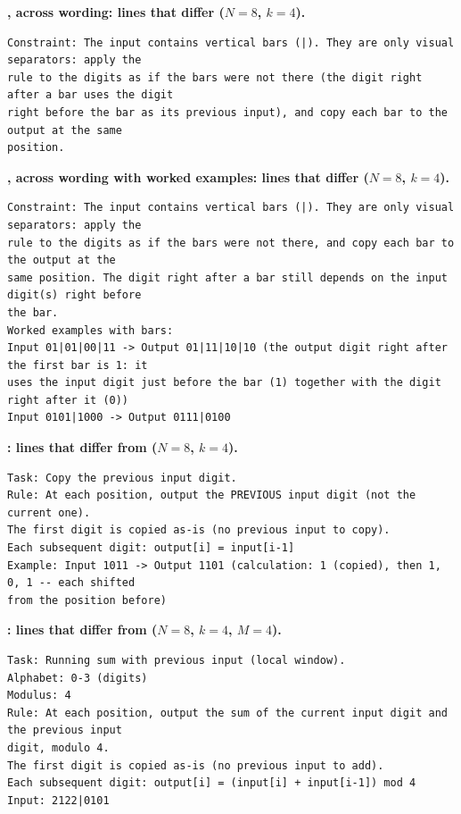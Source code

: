 \par\medskip\noindent\textbf{, across wording: lines that differ ($N = 8$, $k = 4$).}\par
\begin{small}
\begin{verbatim}
Constraint: The input contains vertical bars (|). They are only visual separators: apply the
rule to the digits as if the bars were not there (the digit right after a bar uses the digit
right before the bar as its previous input), and copy each bar to the output at the same
position.
\end{verbatim}
\end{small}

\par\medskip\noindent\textbf{, across wording with worked examples: lines that differ ($N = 8$, $k = 4$).}\par
\begin{small}
\begin{verbatim}
Constraint: The input contains vertical bars (|). They are only visual separators: apply the
rule to the digits as if the bars were not there, and copy each bar to the output at the
same position. The digit right after a bar still depends on the input digit(s) right before
the bar.
Worked examples with bars:
Input 01|01|00|11 -> Output 01|11|10|10 (the output digit right after the first bar is 1: it
uses the input digit just before the bar (1) together with the digit right after it (0))
Input 0101|1000 -> Output 0111|0100
\end{verbatim}
\end{small}

\par\medskip\noindent\textbf{: lines that differ from  ($N = 8$, $k = 4$).}\par
\begin{small}
\begin{verbatim}
Task: Copy the previous input digit.
Rule: At each position, output the PREVIOUS input digit (not the current one).
The first digit is copied as-is (no previous input to copy).
Each subsequent digit: output[i] = input[i-1]
Example: Input 1011 -> Output 1101 (calculation: 1 (copied), then 1, 0, 1 -- each shifted
from the position before)
\end{verbatim}
\end{small}

\par\medskip\noindent\textbf{: lines that differ from  ($N = 8$, $k = 4$, $M = 4$).}\par
\begin{small}
\begin{verbatim}
Task: Running sum with previous input (local window).
Alphabet: 0-3 (digits)
Modulus: 4
Rule: At each position, output the sum of the current input digit and the previous input
digit, modulo 4.
The first digit is copied as-is (no previous input to add).
Each subsequent digit: output[i] = (input[i] + input[i-1]) mod 4
Input: 2122|0101
\end{verbatim}
\end{small}

